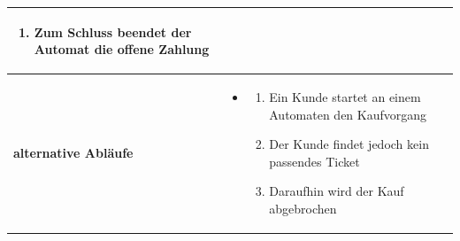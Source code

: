 \documentclass{article}
\begin{document}
\begin{tabularx}{\textwidth}{|l|X|}
\begin{enumerate}
            \item Zum Schluss beendet der Automat die offene Zahlung
        \end{enumerate} \\\hline
        \textbf{alternative Abläufe} & \begin{itemize}
            \item \begin{enumerate}
                \item Ein \gls{Kunde} startet an einem Automaten den Kaufvorgang
                \item Der \gls{Kunde} findet jedoch kein passendes \gls{Ticket}
                \item Daraufhin wird der Kauf abgebrochen
            \end{enumerate}
        \end{itemize} \\\hline
    \end{tabularx}
\end{document}

